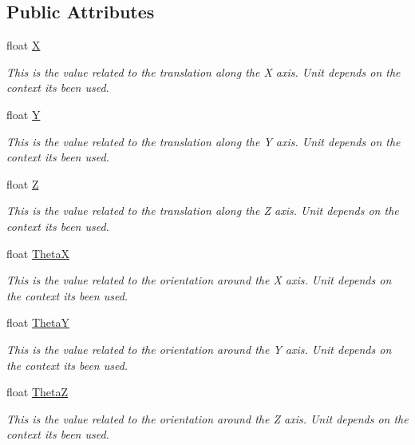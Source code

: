 \subsection*{Public Attributes}
\begin{DoxyCompactItemize}
\item 
float \hyperlink{struct_cartesian_info_a212cc2dcae1697132fc31fa2f5d17269}{X}
\begin{DoxyCompactList}\small\item\em This is the value related to the translation along the X axis. Unit depends on the context it\textquotesingle{}s been used. \end{DoxyCompactList}\item 
float \hyperlink{struct_cartesian_info_a12c2611c89445419b336e58815d87c7c}{Y}
\begin{DoxyCompactList}\small\item\em This is the value related to the translation along the Y axis. Unit depends on the context it\textquotesingle{}s been used. \end{DoxyCompactList}\item 
float \hyperlink{struct_cartesian_info_a14e196e4cb38c0ae7f4658b9b070b7fe}{Z}
\begin{DoxyCompactList}\small\item\em This is the value related to the translation along the Z axis. Unit depends on the context it\textquotesingle{}s been used. \end{DoxyCompactList}\item 
float \hyperlink{struct_cartesian_info_a39135e53155aa4025c40eeefbfd3b17c}{ThetaX}
\begin{DoxyCompactList}\small\item\em This is the value related to the orientation around the X axis. Unit depends on the context it\textquotesingle{}s been used. \end{DoxyCompactList}\item 
float \hyperlink{struct_cartesian_info_a4aef5897f4cdcf7ecc9df6804f844d46}{ThetaY}
\begin{DoxyCompactList}\small\item\em This is the value related to the orientation around the Y axis. Unit depends on the context it\textquotesingle{}s been used. \end{DoxyCompactList}\item 
float \hyperlink{struct_cartesian_info_a2890c501f3b7b9479e12ad51f04f0a7f}{ThetaZ}
\begin{DoxyCompactList}\small\item\em This is the value related to the orientation around the Z axis. Unit depends on the context it\textquotesingle{}s been used. \end{DoxyCompactList}\end{DoxyCompactItemize}


